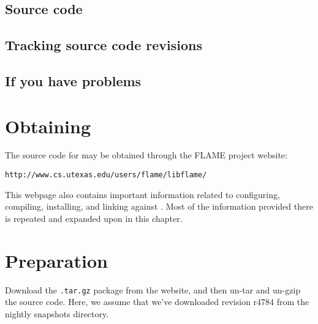 \subsection{Source code}






\subsection{Tracking source code revisions}





\subsection{If you have problems}





\section{Obtaining \libflame}


The source code for \libflame may be obtained through the FLAME project
website:

\begin{Verbatim}[frame=none,framesep=2.5mm,xleftmargin=5mm,commandchars=\\\{\},fontsize=\normalsize]
http://www.cs.utexas.edu/users/flame/libflame/
\end{Verbatim}

\noindent
This webpage also contains important information related to configuring,
compiling, installing, and linking against \libflamens.
Most of the information provided there is repeated and expanded upon in
this chapter.



\section{Preparation}

Download the {\tt .tar.gz} package from the website, and then un-tar and
un-gzip the source code.
Here, we assume that we've downloaded revision r4784 from the nightly
snapshots directory.

